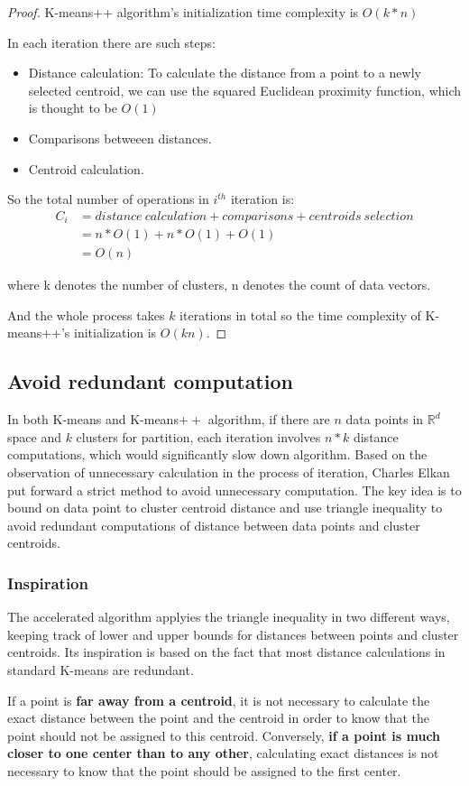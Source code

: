 \documentclass[11pt]{article}
\begin{document}
\begin{proof}
  K-means++ algorithm's initialization time complexity is $O(k*n)$
  \par In each iteration there are such steps:
  \begin{itemize}
    \item Distance calculation: To calculate the distance from a point to a newly selected centroid, we can use the squared Euclidean proximity function, which is thought to be $O(1)$
    \item Comparisons betweeen distances.
    \item Centroid calculation.
  \end{itemize}
  \par So the total number of operations in $i^{th}$ iteration is:
  \begin{equation*}
    \begin{split}
      C_i &=  distance\ calculation + comparisons + centroids\ selection\\
      & = n * O(1) + n * O(1) + O(1) \\
      & = O(n)
    \end{split}
  \end{equation*}
  \par where k denotes the number of clusters, n denotes the count of data vectors.
  \par And the whole process takes $k$ iterations in total so the time complexity of K-means++'s initialization is $O(kn)$.
\end{proof}

\subsection{Avoid redundant computation}
In both K-means and K-means$++$ algorithm, if there are $n$ data points in $\mathbb{R}^ d$ space and $k$ clusters for partition, each iteration involves $n * k$ distance computations, which would significantly slow down algorithm. Based on the observation of  unnecessary calculation in the process of iteration, Charles Elkan put forward a strict method to avoid unnecessary computation.\cite{articleToBound} The key idea is to bound on data point to cluster centroid distance and use triangle inequality to avoid redundant computations of distance between data points and cluster centroids.

\subsubsection{Inspiration}
The accelerated algorithm applyies the triangle inequality in two different ways, keeping track of lower and upper bounds for distances between points and cluster centroids. Its inspiration is based on the fact that most distance calculations in standard K-means are redundant. \par
If a point is \textbf{far away from a centroid}, it is not necessary to calculate the exact distance between the point and the centroid in order to know that the point should not be assigned to this centroid. Conversely, \textbf{if a point is much closer to one center than to any other}, calculating exact distances is not necessary to know that the point should be assigned to the first center. 
\end{document}
